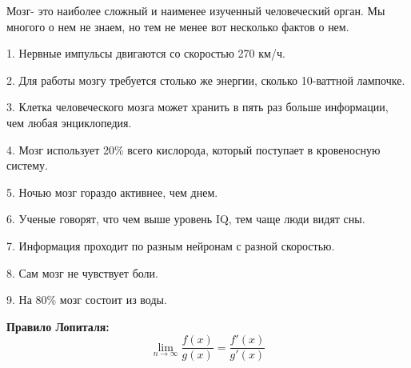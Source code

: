 \documentclass[a5paper,12pt]{book}[2018/02/23]
\begin{document}
Мозг- это наиболее сложный и наименее изученный человеческий орган. Мы многого о нем не знаем, но тем не менее вот несколько фактов о нем. 

1. Нервные импульсы двигаются со скоростью 270 км/ч.

2. Для работы мозгу требуется столько же энергии, сколько 10-ваттной лампочке.

3. Клетка человеческого мозга может хранить в пять раз больше информации, чем любая энциклопедия.

4. Мозг использует 20\% всего кислорода, который поступает в кровеносную систему.

5. Ночью мозг гораздо активнее, чем днем.

6. Ученые говорят, что чем выше уровень IQ, тем чаще люди видят сны.

7. Информация проходит по разным нейронам с разной скоростью.

8. Сам мозг не чувствует боли.

9. На 80\% мозг состоит из воды.

{\bf Правило Лопиталя:}
\[
\lim_{n \to \infty}
\frac{f(x)}{g(x)}=
\frac{f'(x)}{g'(x)}
\]
\end{document}
